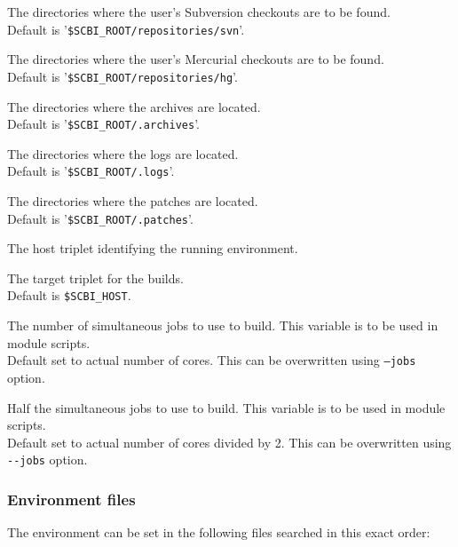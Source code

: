 \documentclass[a4paper,12pt,twoside]{article}
\let\olditem=\item
\def\myitem[#1]{\vspace{10pt}\olditem[#1]}
\newcommand{\code}[1]{\texttt{#1}}
\newcommand{\file}[1]{'{\texttt{#1}}'}
\newcommand{\ddash}{-{}-}
\begin{document}
\begin{description}[before=\let\item\myitem]
	\item[SCBI\_SVN\_REPO] The directories where the user's Subversion checkouts are to be found. \\ Default is \file{\$SCBI\_ROOT/repositories/svn}.

	\item[SCBI\_HG\_REPO] The directories where the user's Mercurial checkouts are to be found. \\ Default is \file{\$SCBI\_ROOT/repositories/hg}.

	\item[SCBI\_ARCHIVES] The directories where the archives are located. \\Default is \file{\$SCBI\_ROOT/.archives}.

	\item[SCBI\_LOGS] The directories where the logs are located. \\Default is \file{\$SCBI\_ROOT/.logs}.

	\item[SCBI\_PATCH] The directories where the patches are located. \\Default is \file{\$SCBI\_ROOT/.patches}.

	\item[SCBI\_HOST] The host triplet identifying the running environment.

	\item[SCBI\_TARGET] The target triplet for the builds. \\Default is \code{\$SCBI\_HOST}.

	\item[SCBI\_JOBS] The number of simultaneous jobs to use to build. This variable is to be used in module scripts. \\Default set to actual number of cores. This can be overwritten using \code{--jobs} option.
	\label{njobs}
	\item[SCBI\_HALF\_JOBS] Half the simultaneous jobs to use to build. This variable is to be used in module scripts. \\Default set to actual number of cores divided by 2. This can be overwritten using \code{\ddash{}jobs} option.\label{half-njobs}
\end{description}

\subsubsection{Environment files}
\label{envfile}

The environment can be set in the following files searched in this exact order:
\end{document}
